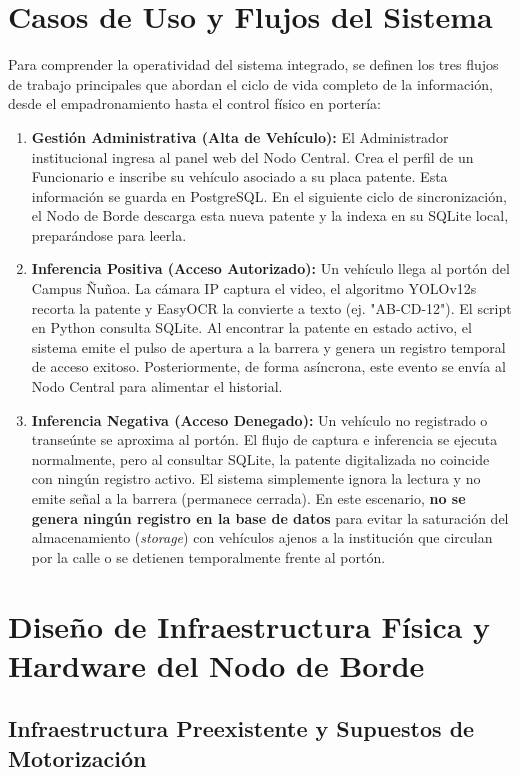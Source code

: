 \section{Casos de Uso y Flujos del Sistema}

Para comprender la operatividad del sistema integrado, se definen los tres flujos de trabajo principales que abordan el ciclo de vida completo de la información, desde el empadronamiento hasta el control físico en portería:

\begin{enumerate}
    \item \textbf{Gestión Administrativa (Alta de Vehículo):} El Administrador institucional ingresa al panel web del Nodo Central. Crea el perfil de un Funcionario e inscribe su vehículo asociado a su placa patente. Esta información se guarda en PostgreSQL. En el siguiente ciclo de sincronización, el Nodo de Borde descarga esta nueva patente y la indexa en su SQLite local, preparándose para leerla.
    \item \textbf{Inferencia Positiva (Acceso Autorizado):} Un vehículo llega al portón del Campus Ñuñoa. La cámara IP captura el video, el algoritmo YOLOv12s recorta la patente y EasyOCR la convierte a texto (ej. "AB-CD-12"). El script en Python consulta SQLite. Al encontrar la patente en estado activo, el sistema emite el pulso de apertura a la barrera y genera un registro temporal de acceso exitoso. Posteriormente, de forma asíncrona, este evento se envía al Nodo Central para alimentar el historial.
    \item \textbf{Inferencia Negativa (Acceso Denegado):} Un vehículo no registrado o transeúnte se aproxima al portón. El flujo de captura e inferencia se ejecuta normalmente, pero al consultar SQLite, la patente digitalizada no coincide con ningún registro activo. El sistema simplemente ignora la lectura y no emite señal a la barrera (permanece cerrada). En este escenario, \textbf{no se genera ningún registro en la base de datos} para evitar la saturación del almacenamiento (\textit{storage}) con vehículos ajenos a la institución que circulan por la calle o se detienen temporalmente frente al portón.
\end{enumerate}

\section{Diseño de Infraestructura Física y Hardware del Nodo de Borde}

\subsection{Infraestructura Preexistente y Supuestos de Motorización}

